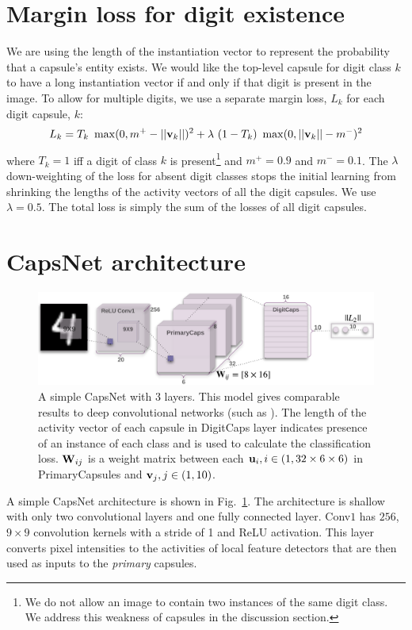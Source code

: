 \documentclass{article}
\begin{document}
\section{Margin loss for digit existence}
We are using the length of the instantiation vector to represent the probability that a capsule's entity exists. We would like the top-level capsule for digit class $k$ to have a long instantiation vector if and only if that digit is present in the image. To allow for multiple digits, we use a separate margin loss, $L_k$ for each digit capsule, $k$:
\begin{equation}
L_k = T_k \ \max(0, m^{+} - ||{\bf v}_k||)^2 + \lambda \ (1-T_k) \ \max(0, ||{\bf v}_k|| - m^{-})^2
\label{digit-loss}
\end{equation}
where $T_k=1$ iff a digit of class $k$ is present\footnote{We do not allow an image to contain two instances of the same digit class. We address this weakness of capsules in the discussion section.} and $m^{+} = 0.9$ and $m^{-} = 0.1$. The $\lambda$ down-weighting of the loss for absent digit classes stops the initial learning from shrinking the lengths of the activity vectors of all the digit capsules. We use $\lambda=0.5$. The total loss is simply the sum of the losses of all digit capsules. 
\section{CapsNet architecture}
\begin{figure}[t]
  \caption{A simple CapsNet with 3 layers. This model gives comparable results to deep convolutional networks (such as \cite{chang2015batch}). The length of the activity vector of each capsule in DigitCaps layer indicates presence of an instance of each class and is used to calculate the classification loss. ${\bf W}_{ij}$ is a weight matrix between each ${\bf u}_i, i \in (1, 32\times6\times6)$ in PrimaryCapsules and ${\bf v}_j, j \in (1, 10)$. }
\label{capsnetArch}
  \centering
    \includegraphics[width=\textwidth]{capsulearch}
\end{figure}
A simple CapsNet architecture is shown in Fig.~\ref{capsnetArch}. The architecture is shallow with only two convolutional layers and one fully connected layer. Conv$1$ has $256$, $9 \times 9$ convolution kernels with a stride of 1 and ReLU activation. This layer converts pixel intensities to the activities of local feature detectors that are then used as inputs to the {\it primary} capsules.
\end{document}
